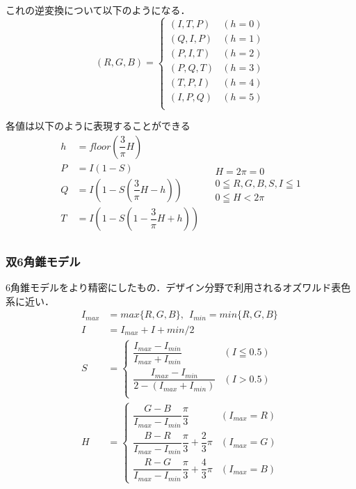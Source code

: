 \documentclass[
]{article}
\begin{document}
これの逆変換について以下のようになる．
\begin{equation}
 (R,G,B) =
\begin{cases}
(I, T, P) & (h = 0) \\
(Q, I, P) & (h = 1) \\
(P, I, T) & (h = 2) \\
(P, Q, T) & (h = 3) \\
(T, P, I) & (h = 4) \\
(I, P, Q) & (h = 5) \\
\end{cases}
\end{equation}

各値は以下のように表現することができる
\begin{equation}
\begin{aligned}
h &= floor(\dfrac{3}{\pi}H) \\
P &= I(1 - S) \\
Q &= I(1 - S(\dfrac{3}{\pi}H - h)) \\
T &= I(1  - S(1 - \dfrac{3}{\pi} H + h)) \\
\end{aligned}
\begin{aligned}
&H = 2\pi = 0 \\
&0 \leqq R, G, B, S, I \leqq 1 \\
&0 \leqq H < 2\pi
\end{aligned}
\end{equation}


\hypertarget{ux53cc6ux89d2ux9310ux30e2ux30c7ux30eb}{%
\subsubsection{双6角錐モデル}\label{ux53cc6ux89d2ux9310ux30e2ux30c7ux30eb}}

6角錐モデルをより精密にしたもの．デザイン分野で利用されるオズワルド表色系に近い．
\begin{equation}
\begin{aligned}
I_{max} &= max\{R, G, B\}, ~~ I_{min} = min\{R, G, B\} \\
I &= I_{max} + I+{min} / 2 \\
S &= 
\begin{cases}
\dfrac{I_{max} - I_{min}}{I_{max} + I_{min}} &(I \leqq 0.5)\\
\dfrac{I_{max} - I_{min}}{2 - (I_{max} + I_{min})} &(I >0.5)\\
\end{cases}
\\
H &= 
\begin{cases}
\dfrac{G - B}{I_{max} - I_{min}}\dfrac{\pi}{3} & (I_{max} = R) \\
\dfrac{B - R}{I_{max} - I_{min}}\dfrac{\pi}{3} + \dfrac{2}{3}\pi & (I_{max} = G) \\
\dfrac{R - G}{I_{max} - I_{min}}\dfrac{\pi}{3} + \dfrac{4}{3}\pi & (I_{max} = B)
\end{cases}
\end{aligned}
\end{equation}
\end{document}
